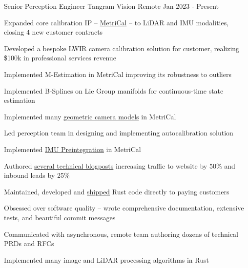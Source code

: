 

\begin{cventries}
  \cventry
    {Senior Perception Engineer}
    {Tangram Vision}
    {Remote}
    {Jan 2023 - Present}
    {
        \begin{cvitems}
            \item{Expanded core calibration IP -- \href{https://docs.tangramvision.com/metrical/intro}{\color{awesome-skyblue}MetriCal} -- to LiDAR and IMU modalities, closing 4 new customer contracts}
            \item{Developed a bespoke LWIR camera calibration solution for customer, realizing \$100k in professional services revenue}
            \item{Implemented M-Estimation in MetriCal improving its robustness to outliers}
            \item{Implemented B-Splines on Lie Group manifolds for continuous-time state estimation}
            \item{Implemented many \href{https://docs.tangramvision.com/metrical/core_concepts/component_models/cameras/}{\color{awesome-skyblue}geometric camera models} in MetriCal}
            \item{Led perception team in designing and implementing autocalibration solution}
            \item{Implemented \href{https://www.tangramvision.com/blog/imu-preintegration-basics-part-5-of-5}{\color{awesome-skyblue}IMU Preintegration} in MetriCal}
            \item{Authored \href{https://www.tangramvision.com/author/devon-morris}{\color{awesome-skyblue}several technical blogposts} increasing traffic to website by 50\% and inbound leads by 25\%}
            \item{Maintained, developed and \href{https://hubgw.docker.com/r/tangramvision/cli}{\color{awesome-skyblue}shipped} Rust code directly to paying customers}
            \item{Obsessed over software quality -- wrote comprehensive documentation, extensive tests, and beautiful commit messages}
            \item{Communicated with asynchronous, remote team authoring dozens of technical PRDs and RFCs}
            \item{Implemented many image and LiDAR processing algorithms in Rust}
        \end{cvitems}
    }


\end{cventries}
